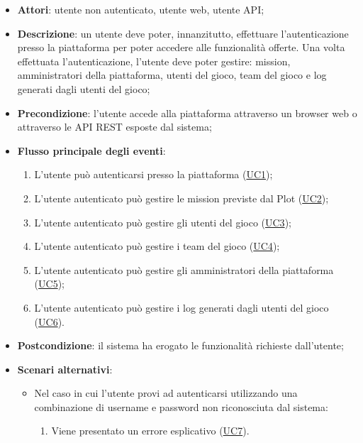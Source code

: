 \begin{itemize}
\item \textbf{Attori}: utente non autenticato, utente web, utente API;
\item \textbf{Descrizione}: un utente deve poter, innanzitutto, effettuare l'autenticazione presso la piattaforma per poter accedere alle funzionalità offerte.
Una volta effettuata l'autenticazione, l'utente deve poter gestire: mission, amministratori della piattaforma, utenti del gioco, team del gioco e log generati dagli utenti del gioco; 
      \item \textbf{Precondizione}: l'utente accede alla piattaforma attraverso un browser web o attraverso le API REST esposte dal sistema;

        \item \textbf{Flusso principale degli eventi}:
          \begin{enumerate}
          \item L'utente può autenticarsi presso la piattaforma (\hyperlink{UC1}{UC1});
          \item L'utente autenticato può gestire le mission previste dal Plot (\hyperlink{UC2}{UC2});
          \item L'utente autenticato può gestire gli utenti del gioco (\hyperlink{UC3}{UC3});
          \item L'utente autenticato può gestire i team del gioco (\hyperlink{UC4}{UC4});
          \item L'utente autenticato può gestire gli amministratori della piattaforma (\hyperlink{UC5}{UC5});
          \item L'utente autenticato può gestire i log generati dagli utenti del gioco (\hyperlink{UC6}{UC6}).

      \end{enumerate}
    \item \textbf{Postcondizione}: il sistema ha erogato le funzionalità richieste dall'utente;
     \item \textbf{Scenari alternativi}: 
      \begin{itemize}
       \item Nel caso in cui l'utente provi ad autenticarsi utilizzando una combinazione di username e password non riconosciuta dal sistema: 
       \begin{enumerate}
          \item Viene presentato un errore esplicativo (\hyperlink{UC7}{UC7}).
       \end{enumerate}
      \end{itemize}
  \end{itemize}
\hypertarget{UC1}{}
